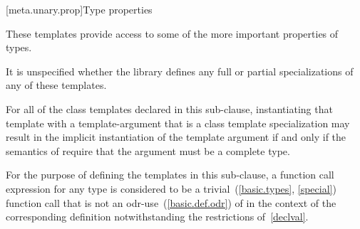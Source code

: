 [meta.unary.prop]{Type properties}

\pnum
These templates provide access to some of the more important
properties of types.

\pnum
It is unspecified whether the library defines any full or partial
specializations of any of these templates.

\pnum
For all of the class templates  declared in this sub-clause,
instantiating that template with a template-argument that is a class
template specialization may result in the implicit instantiation of
the template argument if and only if the semantics of  require that
the argument must be a complete type.

\pnum
For the purpose of defining the templates in this sub-clause,
a function call expression  for any type 
is considered to be a trivial~(\ref{basic.types}, \ref{special}) function call
that is not an odr-use~(\ref{basic.def.odr}) of 
in the context of the corresponding definition
notwithstanding the restrictions of~\ref{declval}.

